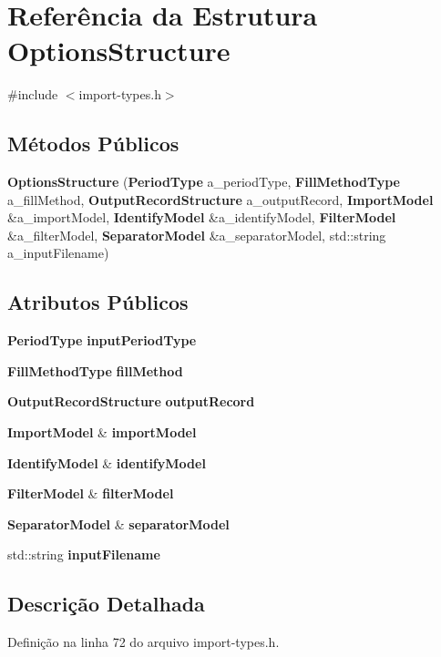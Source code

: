 \section{Referência da Estrutura Options\+Structure}
\label{struct_options_structure}


{\ttfamily \#include $<$import-\/types.\+h$>$}

\subsection*{Métodos Públicos}
\begin{DoxyCompactItemize}
\item 
{\bf Options\+Structure} ({\bf Period\+Type} a\+\_\+period\+Type, {\bf Fill\+Method\+Type} a\+\_\+fill\+Method, {\bf Output\+Record\+Structure} a\+\_\+output\+Record, {\bf Import\+Model} \&a\+\_\+import\+Model, {\bf Identify\+Model} \&a\+\_\+identify\+Model, {\bf Filter\+Model} \&a\+\_\+filter\+Model, {\bf Separator\+Model} \&a\+\_\+separator\+Model, std\+::string a\+\_\+input\+Filename)
\end{DoxyCompactItemize}
\subsection*{Atributos Públicos}
\begin{DoxyCompactItemize}
\item 
{\bf Period\+Type} {\bf input\+Period\+Type}
\item 
{\bf Fill\+Method\+Type} {\bf fill\+Method}
\item 
{\bf Output\+Record\+Structure} {\bf output\+Record}
\item 
{\bf Import\+Model} \& {\bf import\+Model}
\item 
{\bf Identify\+Model} \& {\bf identify\+Model}
\item 
{\bf Filter\+Model} \& {\bf filter\+Model}
\item 
{\bf Separator\+Model} \& {\bf separator\+Model}
\item 
std\+::string {\bf input\+Filename}
\end{DoxyCompactItemize}


\subsection{Descrição Detalhada}


Definição na linha 72 do arquivo import-\/types.\+h.



